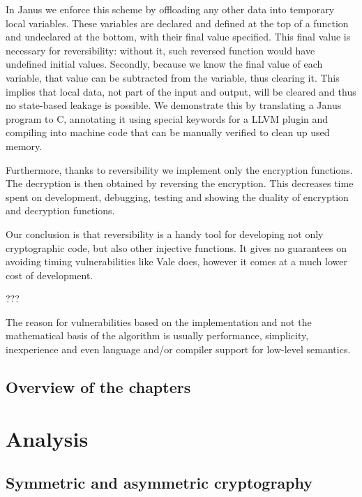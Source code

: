 \documentclass[a4paper,10pt,openright]{memoir}
\begin{document}
In Janus we enforce this scheme by offloading any other data into 
temporary local variables. These variables are declared and defined at 
the top of a function and undeclared at the bottom, with their final 
value specified. This final value is necessary for reversibility: 
without it, such reversed function would have undefined initial values. 
Secondly, because we know the final value of each variable, that value 
can be subtracted from the variable, thus clearing it. This implies 
that local data, not part of the input and output, will be cleared and 
thus no state-based leakage is possible. We demonstrate this by 
translating a Janus program to C, annotating it using special keywords 
for a LLVM plugin and compiling into machine code that can be manually 
verified to clean up used memory.

Furthermore, thanks to reversibility we implement only the encryption 
functions. The decryption is then obtained by reversing the encryption. 
This decreases time spent on development, debugging, testing and 
showing the duality of encryption and decryption functions.

Our conclusion is that reversibility is a handy tool for developing not 
only cryptographic code, but also other injective functions. It gives 
no guarantees on avoiding timing vulnerabilities like Vale does, 
however it comes at a much lower cost of development.




???

The reason for 
vulnerabilities based on the implementation and not the mathematical 
basis of the algorithm is usually performance, simplicity, inexperience 
and even language and/or compiler support for low-level semantics.






\section{Overview of the chapters}


\chapter{Analysis}


\section{Symmetric and asymmetric cryptography}
\end{document}
